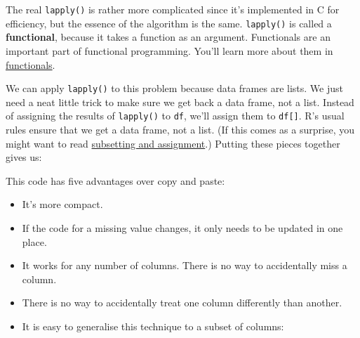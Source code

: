 \begin{Shaded}
\begin{Highlighting}[]
\StringTok{ }\NormalTok{(}\NormalTok{, }
  \StringTok{ }
\NormalTok{\}}
\end{Highlighting}
\end{Shaded}

The real \texttt{lapply()} is rather more complicated since it's
implemented in C for efficiency, but the essence of the algorithm is the
same. \texttt{lapply()} is called a \textbf{functional}, because it
takes a function as an argument. Functionals are an important part of
functional programming. You'll learn more about them in
\hyperref[functionals]{functionals}.

We can apply \texttt{lapply()} to this problem because data frames are
lists. We just need a neat little trick to make sure we get back a data
frame, not a list. Instead of assigning the results of \texttt{lapply()}
to \texttt{df}, we'll assign them to \texttt{df{[}{]}}. R's usual rules
ensure that we get a data frame, not a list. (If this comes as a
surprise, you might want to read \hyperref[subassignment]{subsetting and
assignment}.) Putting these pieces together gives us:

\begin{Shaded}
\begin{Highlighting}[]
\StringTok{ }
  \NormalTok{x[x ==}\StringTok{ }\NormalTok{-}\NormalTok{] <-}\StringTok{ }
\NormalTok{\}}
\StringTok{ }
\end{Highlighting}
\end{Shaded}

This code has five advantages over copy and paste:

\begin{itemize}
\item
  It's more compact.
\item
  If the code for a missing value changes, it only needs to be updated
  in one place.
\item
  It works for any number of columns. There is no way to accidentally
  miss a column.
\item
  There is no way to accidentally treat one column differently than
  another.
\item
  It is easy to generalise this technique to a subset of columns:

\begin{Shaded}
\begin{Highlighting}[]
\NormalTok{df[}\NormalTok{:}\NormalTok{] <-}\StringTok{ }\NormalTok{(df[}\NormalTok{:}\NormalTok{], fix_missing)}
\end{Highlighting}
\end{Shaded}
\end{itemize}


